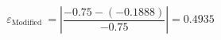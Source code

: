 \begin{solution}
$$
\varepsilon_{\text {Modified }}=\left|\frac{-0.75-(-0.1888)}{-0.75}\right|=0.4935
$$







































\end{solution}


